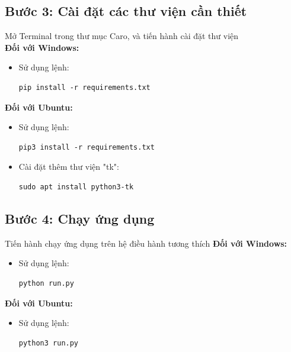 \documentclass[a4paper]{article}
\newlength{\mylistingwidth}
\begin{document}
\subsection*{Bước 3: Cài đặt các thư viện cần thiết}
\begin{par}
    Mở Terminal trong thư mục Caro, và tiến hành cài đặt thư viện \\
    \textbf{Đối với Windows:}
    \begin{itemize}
        \item Sử dụng lệnh:
        \settowidth{\mylistingwidth}{\ttfamily pip install -r requirements.txt}
    \begin{lstlisting}
pip install -r requirements.txt
    \end{lstlisting}
    \end{itemize}
    \textbf{Đối với Ubuntu:}
    \begin{itemize}
        \item Sử dụng lệnh:
        \settowidth{\mylistingwidth}{\ttfamily pip3 install -r requirements.txt}
    \begin{lstlisting}
pip3 install -r requirements.txt
    \end{lstlisting}
        \item Cài đặt thêm thư viện "tk":
        \settowidth{\mylistingwidth}{\ttfamily sudo apt install python3-tk}
    \begin{lstlisting}
sudo apt install python3-tk
    \end{lstlisting}
    \end{itemize}
\end{par}

\subsection*{Bước 4: Chạy ứng dụng}
\begin{par}
    Tiến hành chạy ứng dụng trên hệ điều hành tương thích
    \textbf{Đối với Windows:}
    \begin{itemize}
        \item Sử dụng lệnh:
        \settowidth{\mylistingwidth}{\ttfamily python run.py}
    \begin{lstlisting}
python run.py
    \end{lstlisting}
    \end{itemize}
    \textbf{Đối với Ubuntu:}
    \begin{itemize}
        \item Sử dụng lệnh:
        \settowidth{\mylistingwidth}{\ttfamily python3 run.py}
    \begin{lstlisting}
python3 run.py
    \end{lstlisting}
    \end{itemize}
\end{par}
\end{document}
